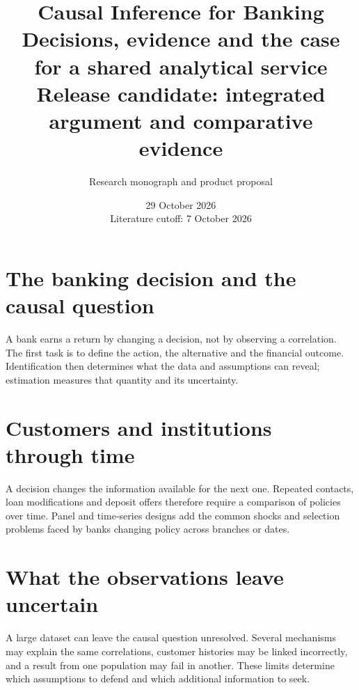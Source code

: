 \documentclass[11pt,a4paper,openany]{book}
\title{\sffamily\bfseries\color{ink}Causal Inference for Banking\\[14pt]
\Large Decisions, evidence and the case for a shared analytical service\\[8pt]\large Release candidate: integrated argument and comparative evidence}
\author{Research monograph and product proposal}
\date{29 October 2026\\Literature cutoff: 7 October 2026}
\begin{document}
\frontmatter
\maketitle

\begingroup\setlength{\parskip}{0pt}\tableofcontents\endgroup
\mainmatter
\part{The banking decision and the causal question}
\label{reading:part-decision}
A bank earns a return by changing a decision, not by observing a correlation.
The first task is to define the action, the alternative and the financial outcome.
Identification then determines what the data and assumptions can reveal;
estimation measures that quantity and its uncertainty.







\part{Customers and institutions through time}
\label{reading:part-time}
A decision changes the information available for the next one. Repeated
contacts, loan modifications and deposit offers therefore require a comparison
of policies over time. Panel and time-series designs add the common shocks
and selection problems faced by banks changing policy across branches or dates.











\part{What the observations leave uncertain}
\label{reading:part-uncertainty}
A large dataset can leave the causal question unresolved. Several mechanisms
may explain the same correlations, customer histories may be linked incorrectly,
and a result from one population may fail in another. These limits determine
which assumptions to defend and which additional information to seek.
\end{document}
